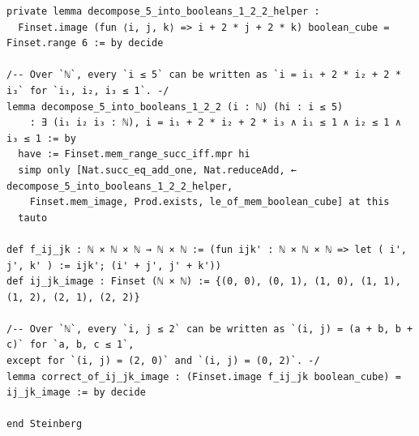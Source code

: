 \begin{Verbatim}
private lemma decompose_5_into_booleans_1_2_2_helper :
  Finset.image (fun ⟨i, j, k⟩ => i + 2 * j + 2 * k) boolean_cube = Finset.range 6 := by decide

/-- Over `ℕ`, every `i ≤ 5` can be written as `i = i₁ + 2 * i₂ + 2 * i₃` for `i₁, i₂, i₃ ≤ 1`. -/
lemma decompose_5_into_booleans_1_2_2 (i : ℕ) (hi : i ≤ 5)
    : ∃ (i₁ i₂ i₃ : ℕ), i = i₁ + 2 * i₂ + 2 * i₃ ∧ i₁ ≤ 1 ∧ i₂ ≤ 1 ∧ i₃ ≤ 1 := by
  have := Finset.mem_range_succ_iff.mpr hi
  simp only [Nat.succ_eq_add_one, Nat.reduceAdd, ← decompose_5_into_booleans_1_2_2_helper,
    Finset.mem_image, Prod.exists, le_of_mem_boolean_cube] at this
  tauto

def f_ij_jk : ℕ × ℕ × ℕ → ℕ × ℕ := (fun ijk' : ℕ × ℕ × ℕ => let ( i', j', k' ) := ijk'; (i' + j', j' + k'))
def ij_jk_image : Finset (ℕ × ℕ) := {(0, 0), (0, 1), (1, 0), (1, 1), (1, 2), (2, 1), (2, 2)}

/-- Over `ℕ`, every `i, j ≤ 2` can be written as `(i, j) = (a + b, b + c)` for `a, b, c ≤ 1`,
except for `(i, j) = (2, 0)` and `(i, j) = (0, 2)`. -/
lemma correct_of_ij_jk_image : (Finset.image f_ij_jk boolean_cube) = ij_jk_image := by decide

end Steinberg
\end{Verbatim}
